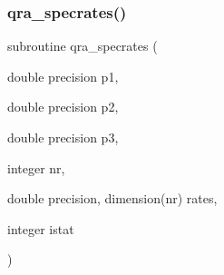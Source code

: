 \mbox{\label{qra__specrates_8f_abd5f419ff83b083d70cff47cd2fc3190}} 
\subsubsection{\texorpdfstring{qra\+\_\+specrates()}{qra\_specrates()}}
{\footnotesize\ttfamily subroutine qra\+\_\+specrates (\begin{DoxyParamCaption}\item[{double precision}]{p1,  }\item[{double precision}]{p2,  }\item[{double precision}]{p3,  }\item[{integer}]{nr,  }\item[{double precision, dimension(nr)}]{rates,  }\item[{integer}]{istat }\end{DoxyParamCaption})}


